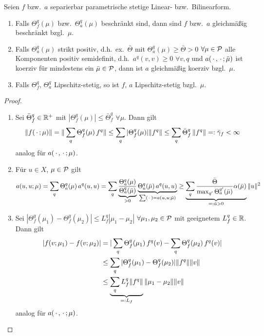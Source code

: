 \begin{satz}
	Seien $f$ bzw.\ $a$ separierbar parametrische stetige Linear- bzw.\ Bilinearform.
	\begin{enumerate}
		\item Falls $\Theta_f^q(\mu)$ bzw.\ $\Theta_a^q(\mu)$ beschränkt sind, dann sind $f$ bzw.\ $a$ gleichmäßig beschränkt bzgl.\ $\mu$.
		\item Falls $\Theta_a^q(\mu)$ strikt positiv, d.h.\ ex.\ $\bar \Theta$ mit $\Theta_a^q(\mu) \geq \bar \Theta > 0$ $\forall \mu \in \mathcal{P}$ alle Komponenten positiv semidefinit, d.h.\ $a^q(v,v) \geq 0$ $\forall v,q$ und $a(\,\cdot\,,\,\cdot\,;\bar \mu)$ ist koerziv für mindestens ein $\bar \mu \in \mathcal{P}$, dann ist $a$ gleichmäßig koerziv bzgl.\ $\mu$.
		\item Falls $\Theta_f^q$, $\Theta_a^q$ Lipschitz-stetig, so ist $f$, $a$ Lipschitz-stetig bzgl.\ $\mu$.
	\end{enumerate}

	\begin{proof} \beginwithlistbew
		\begin{enumerate}
			\item Sei $\bar \Theta_f^q \in \mathbb{R}^+$ mit $|\Theta_f^q(\mu)| \leq \bar \Theta_f^q$ $\forall \mu$. Dann gilt
				\[
					\|f(\,\cdot\,;\mu)\| = \|\sum_q \Theta_f^q(\mu) \, f^q\| \leq \sum_q |\Theta_f^q(\mu)| \|f^q\| \leq \sum_q \bar \Theta_f^q \, \|f^q\| =: \bar \gamma_f < \infty
				\]
				analog für $a(\,\cdot\,,\,\cdot\,;\mu)$.
			\item Für $u \in X$, $\mu \in \mathcal{P}$ gilt
				\[
					a(u,u;\mu) = \sum_q \Theta_a^q(\mu) \, a^q(u,u) = \sum_q \underbrace{\frac{\Theta_a^q(\mu)}{\Theta_a^q(\bar \mu)}}_{> 0} \underbrace{\Theta_a^q(\bar\mu) \, a^q(u,u)}_{\sum (\,\cdot\,) = a(u,u;\bar\mu)} \geq \underbrace{\sum_q \frac{\bar \Theta}{\max_{q'} \Theta_a^{q'}(\bar \mu)} \alpha(\bar \mu)}_{=: \bar \alpha > 0} \|u\|^2
				\]
			\item Sei $|\Theta_f^q(\mu_1)-\Theta_f^q(\mu_2)| \leq L_f^q |\mu_1 - \mu_2|$ $\forall \mu_1,\mu_2 \in \mathcal{P}$ mit geeignetem $L_f^q \in \mathbb{R}$.
				Dann gilt
				\begin{align*}
					|f(v;\mu_1) - f(v;\mu_2)| &= |\sum_q \Theta_f^q(\mu_1) \, f^q(v) - \sum_q \Theta_f^q(\mu_2) \, f^q(v)|\\
					&\leq \sum_q |\Theta_f^q(\mu_1) - \Theta_f^q(\mu_2)| \|f^q\| \|v\| \\
					&\leq \underbrace{\sum_q L_f^q \|f^q\|}_{=: L_f} \|\mu_1 - \mu_2\| \|v\|
				\end{align*}
				analog für $a(\,\cdot\,,\,\cdot\,;\mu)$.
		\end{enumerate}
	\end{proof}
\end{satz}

